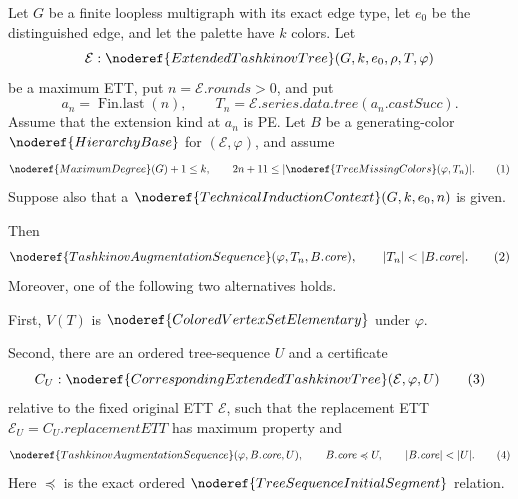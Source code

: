 \begin{theorem}
Let \(G\) be a finite loopless multigraph with its exact edge type, let
\(e_0\) be the distinguished edge, and let the palette have \(k\) colors.
Let
\[
 \mathcal E:\noderef{ExtendedTashkinovTree}(G,k,e_0,\rho,T,\varphi)
\]
be a maximum ETT, put \(n=\mathcal E.\mathit{rounds}>0\), and put
\[
 a_n=\operatorname{Fin.last}(n),\qquad
 T_n=\mathcal E.\mathit{series.data.tree}(a_n.\mathit{castSucc}).
\]
Assume that the extension kind at \(a_n\) is PE.  Let
\(B\) be a generating-color \(\noderef{HierarchyBase}\) for
\((\mathcal E,\varphi)\), and assume
\[
 \noderef{MaximumDegree}(G)+1\leq k,
 \qquad
 2n+11\leq |\noderef{TreeMissingColors}(\varphi,T_n)|.          \tag{1}
\]
Suppose also that a
\(\noderef{TechnicalInductionContext}(G,k,e_0,n)\) is given.

Then
\[
 \noderef{TashkinovAugmentationSequence}
       (\varphi,T_n,B.\mathit{core}),
 \qquad |T_n|<|B.\mathit{core}|.                                \tag{2}
\]
Moreover, one of the following two alternatives holds.

First, \(V(T)\) is
\(\noderef{ColoredVertexSetElementary}\) under \(\varphi\).

Second, there are an ordered tree-sequence \(U\) and a certificate
\[
 C_U:\noderef{CorrespondingExtendedTashkinovTree}
       (\mathcal E,\varphi,U)                                   \tag{3}
\]
relative to the fixed original ETT \(\mathcal E\), such that the replacement
ETT \(\mathcal E_U=C_U.\mathit{replacementETT}\) has maximum property and
\[
 \noderef{TashkinovAugmentationSequence}
       (\varphi,B.\mathit{core},U),\qquad
 B.\mathit{core}\preccurlyeq U,
 \qquad |B.\mathit{core}|<|U|.                                  \tag{4}
\]
Here \(\preccurlyeq\) is the exact ordered
\(\noderef{TreeSequenceInitialSegment}\) relation.


\end{theorem}
